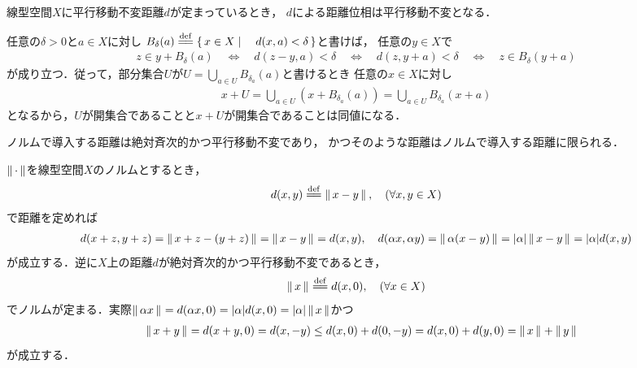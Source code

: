 	\begin{screen}
		\begin{thm}[平行移動不変距離による距離位相は平行移動不変]
			線型空間$X$に平行移動不変距離$d$が定まっているとき，
			$d$による距離位相は平行移動不変となる．
		\end{thm}
	\end{screen}
	
	\begin{prf}
		任意の$\delta>0$と$a \in X$に対し
		$B_\delta(a) \defeq \Set{x \in X}{d(x,a) < \delta}$と書けば，
		任意の$y \in X$で
		\begin{align}
			z \in y + B_\delta(a)
			\quad \Longleftrightarrow \quad
			d(z-y,a) < \delta
			\quad \Longleftrightarrow \quad
			d(z,y+a) < \delta
			\quad \Longleftrightarrow \quad
			z \in B_\delta(y+a)
		\end{align}
		が成り立つ．従って，部分集合$U$が$U = \bigcup_{a \in U}B_{\delta_a}(a)$と書けるとき
		任意の$x \in X$に対し
		\begin{align}
			x + U = \bigcup_{a \in U} \left(x+B_{\delta_a}(a)\right)
			= \bigcup_{a \in U} B_{\delta_a}(x+a)
		\end{align}
		となるから，$U$が開集合であることと$x + U$が開集合であることは同値になる．
		\QED
	\end{prf}
	
	\begin{screen}
		\begin{thm}[絶対斉次的かつ平行移動不変な距離はノルムで導入する距離に限られる]
			ノルムで導入する距離は絶対斉次的かつ平行移動不変であり，
			かつそのような距離はノルムで導入する距離に限られる．
		\end{thm}
	\end{screen}
	
	\begin{prf}
		$\left\|\, \cdot\, \right\|_{}$を線型空間$X$のノルムとするとき，
		\begin{align}
			d(x,y) \defeq \Norm{x-y}{}, \quad (\forall x,y \in X)
		\end{align}
		で距離を定めれば
		\begin{align}
			d(x+z,y+z) = \left\|\, x+z-(y+z)\, \right\|_{} = \left\|\, x-y\, \right\|_{} = d(x,y),
			\quad d(\alpha x, \alpha y)
			= \left\|\, \alpha (x-y)\, \right\|_{} = |\alpha|\left\|\, x-y\, \right\|_{} = |\alpha|d(x,y)
		\end{align}
		が成立する．逆に$X$上の距離$d$が絶対斉次的かつ平行移動不変であるとき，
		\begin{align}
			\Norm{x}{} \defeq d(x,0),\quad (\forall x \in X)
		\end{align}
		でノルムが定まる．実際$\left\|\, \alpha x\, \right\|_{} = d(\alpha x,0) 
		= |\alpha|d(x,0) = |\alpha|\left\|\, x\, \right\|_{}$かつ
		\begin{align}
			\quad \left\|\, x+y\, \right\|_{} = d(x+y,0) = d(x,-y) 
			\leq d(x,0) + d(0,-y) = d(x,0) + d(y,0) = \left\|\, x\, \right\|_{} + \left\|\, y\, \right\|_{}
		\end{align}
		が成立する．
		\QED
	\end{prf}
	
